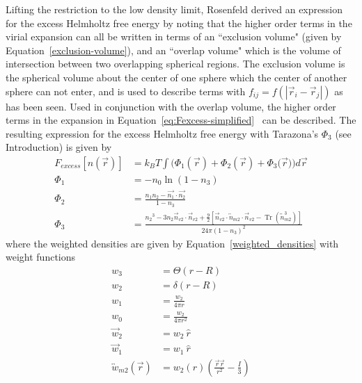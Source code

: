 \documentclass[double,12pt]{beavtex}
\begin{document}
Lifting the restriction to the low density limit, Rosenfeld derived an
expression for the excess Helmholtz free energy by noting that the higher
order terms in the virial expansion can all be written in terms of an 
``exclusion volume" (given by Equation~\ref{exclusion-volume}), 
and an ``overlap volume" which is the volume of intersection between two 
overlapping spherical regions.
The exclusion volume is the spherical volume about the center of one sphere 
which the center of another sphere can not enter, and is used to describe
terms with $f_{ij}=f(|\vec r_i - \vec r_j|)$ as has been seen. Used in conjunction 
with the overlap volume, the higher order terms in the expansion
in Equation~\ref{eq:Fexcess-simplified}~\cite{rosenfeld1988} can be described. 
%
The resulting expression for the excess Helmholtz free energy with Tarazona's $\Phi_3$
(see Introduction) is given by
\begin{align}
    F_{excess}[n(\vec{r})] &= k_BT\int(\Phi_1(\vec{r})+\Phi_2(\vec{r})+\Phi_3(\vec{r}{)) d}\vec{r} \\
    \Phi_1 &= -n_{0}\ln(1-n_{3}) \\
    \Phi_2 &= \frac{n_{1}n_{2}-\vec{n_{1}}\cdot\vec{n_{2}}}{1-n_{3}} \\
    \Phi_3 &= \frac{{n_2}^3-3n_2\vec{n}_{v2}\cdot\vec{n}_{v2}+\frac{9}{2}[\vec{n}_{v2}\cdot{\overleftrightarrow{n}_{m2}}\cdot{\vec{n}_{v2}}-\operatorname{Tr}({\overleftrightarrow{n}^3_{m2}})]}{24\pi(1-n_3)^2}  
\end{align}
where the weighted densities are given by Equation~\ref{weighted_densities} with 
weight functions
\begin{align} 
      w_3 &= \Theta(r-R)  \label{scalar-weight3} \\
      w_2 &= \delta(r-R)  \\
      w_1 &= \frac{w_2}{4\pi r}  \\
      w_0 &= \frac{w_2}{4\pi r^2} \label{scalar-weight0}  \\
      \vec {w}_2 &= w_2~\hat r \\
      \vec {w}_1 &= w_1~\hat r \\
      \overleftrightarrow{w}_{m2}(\vec{r}) &= w_2(r)\left(\frac{\vec{r}\vec{r}}{r^2}-\frac{I}{3}\right) 
\end{align}
\end{document}
